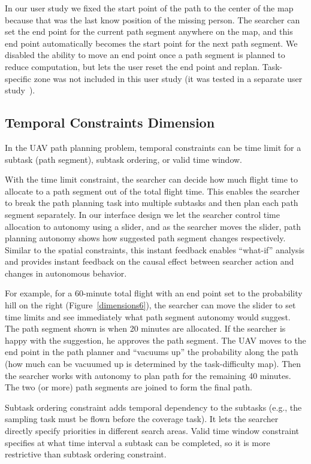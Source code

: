 In our user study we fixed the start point of the path to the center of the map because that was the last know position of the missing person. The searcher can set the end point for the current path segment anywhere on the map, and this end point automatically becomes the start point for the next path segment. We disabled the ability to move an end point once a path segment is planned to reduce computation, but lets the user reset the end point and replan. Task-specific zone was not included in this user study (it was tested in a separate user study~\cite{Clark2013Hierarchical}).

\subsection{Temporal Constraints Dimension}

In the UAV path planning problem, temporal constraints can be time limit for a subtask (path segment), subtask ordering, or valid time window.

With the time limit constraint, the searcher can decide how much flight time to allocate to a path segment out of the total flight time. This enables the searcher to break the path planning task into multiple subtasks and then plan each path segment separately. In our interface design we let the searcher control time allocation to autonomy using a slider, and as the searcher moves the slider, path planning autonomy shows how suggested path segment changes respectively. Similar to the spatial constraints, this instant feedback enables ``what-if'' analysis and provides instant feedback on the causal effect between searcher action and changes in autonomous behavior.

For example, for a 60-minute total flight with an end point set to the probability hill on the right (Figure~\ref{dimensions6}), the searcher can move the slider to set time limits and see immediately what path segment autonomy would suggest. The path segment shown is when 20 minutes are allocated. If the searcher is happy with the suggestion, he approves the path segment. The UAV moves to the end point in the path planner and ``vacuums up'' the probability along the path (how much can be vacuumed up is determined by the task-difficulty map). Then the searcher works with autonomy to plan path for the remaining 40 minutes. The two (or more) path segments are joined to form the final path.

Subtask ordering constraint adds temporal dependency to the subtasks (e.g., the sampling task must be flown before the coverage task). It lets the searcher directly specify priorities in different search areas. Valid time window constraint specifies at what time interval a subtask can be completed, so it is more restrictive than subtask ordering constraint.

